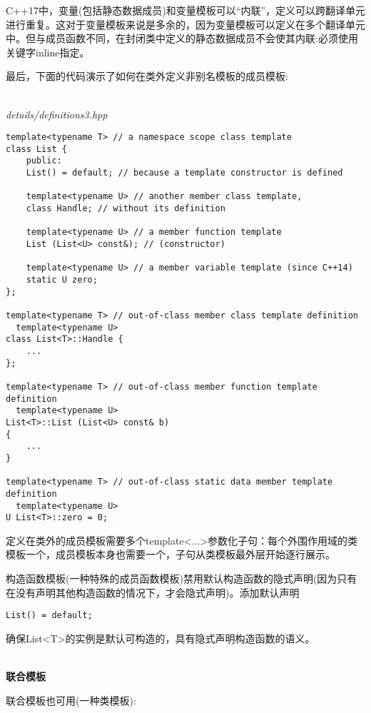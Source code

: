 C++17中，变量(包括静态数据成员)和变量模板可以“内联”，定义可以跨翻译单元进行重复。这对于变量模板来说是多余的，因为变量模板可以定义在多个翻译单元中。但与成员函数不同，在封闭类中定义的静态数据成员不会使其内联:必须使用关键字inline指定。

最后，下面的代码演示了如何在类外定义非别名模板的成员模板:

\hspace*{\fill} \\ %
\noindent
\textit{details/definitions3.hpp}
\begin{lstlisting}[style=styleCXX]
template<typename T> // a namespace scope class template
class List {
	public:
	List() = default; // because a template constructor is defined
	
	template<typename U> // another member class template,
	class Handle; // without its definition
	
	template<typename U> // a member function template
	List (List<U> const&); // (constructor)
	
	template<typename U> // a member variable template (since C++14)
	static U zero;
};

template<typename T> // out-of-class member class template definition
  template<typename U>
class List<T>::Handle {
	...
};

template<typename T> // out-of-class member function template definition
  template<typename U>
List<T>::List (List<U> const& b)
{
	...
}

template<typename T> // out-of-class static data member template definition
  template<typename U>
U List<T>::zero = 0;
\end{lstlisting}

定义在类外的成员模板需要多个template<...>参数化子句：每个外围作用域的类模板一个，成员模板本身也需要一个，子句从类模板最外层开始逐行展示。

构造函数模板(一种特殊的成员函数模板)禁用默认构造函数的隐式声明(因为只有在没有声明其他构造函数的情况下，才会隐式声明)。添加默认声明

\begin{lstlisting}[style=styleCXX]
List() = default;
\end{lstlisting}

确保List<T>的实例是默认可构造的，具有隐式声明构造函数的语义。

\hspace*{\fill} \\ %
\noindent
\textbf{联合模板}

联合模板也可用(一种类模板):

